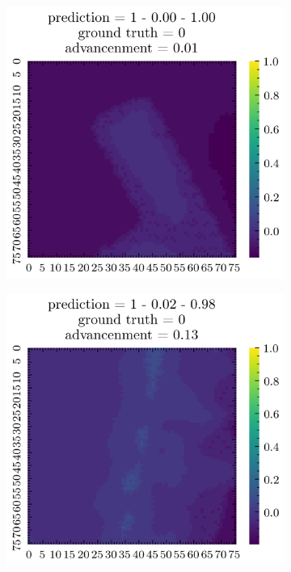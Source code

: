 \documentclass[../document.tex]{subfiles}
\begin{document}
\begin{figure}[H]
\begin{subfigure}[b]{0.19\textwidth}
    \end{subfigure}  
    \begin{subfigure}[b]{0.19\textwidth}
        \includegraphics[width=\linewidth]{../img/5/quarry/false_negative/patch-2d-2.png}
    \end{subfigure}
    \begin{subfigure}[b]{0.19\textwidth}
        \includegraphics[width=\linewidth]{../img/5/quarry/false_negative/patch-2d-3.png}

\end{subfigure}
\end{figure}
\end{document}
